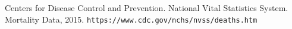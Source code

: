 \documentclass[letterpaper, 10 pt, conference]{ieeeconf}  %
\begin{document}
\begin{thebibliography}{99}

 Centers for Disease Control and Prevention. National Vital Statistics System. Mortality Data, 2015. \texttt{https://www.cdc.gov/nchs/nvss/deaths.htm}







\end{thebibliography}
\end{document}
